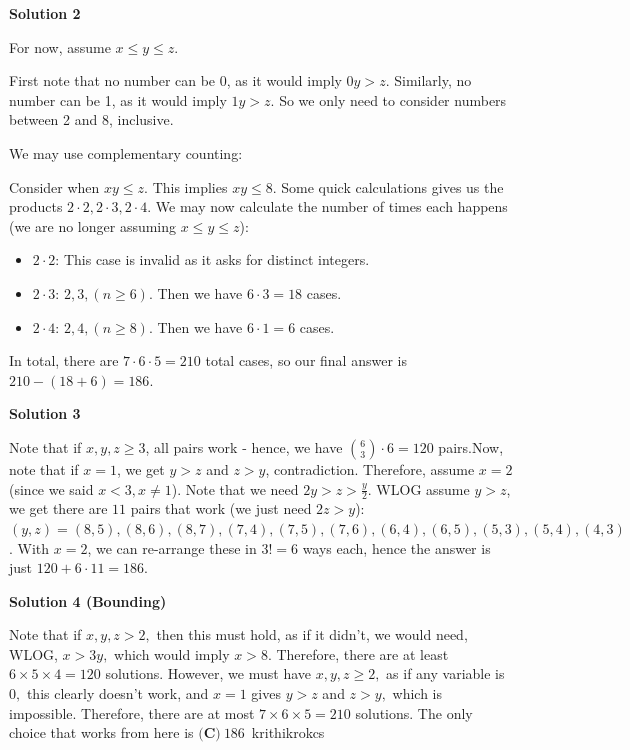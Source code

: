 \begin{enumerate}
 



\textbf{Solution 2}

For now, assume $x\leq y\leq z$.

 First note that no number can be 0, as it would imply $0y>z$. Similarly, no number can be 1, as it would imply $1y>z$. So we only need to consider numbers between 2 and 8, inclusive.

 We may use complementary counting:

 Consider when $xy\leq z$. This implies $xy\leq 8$. Some quick calculations gives us the products $2\cdot2,2\cdot3,2\cdot4$. We may now calculate the number of times each happens (we are no longer assuming $x\leq y\leq z$):

 
            \begin{itemize}
        \item $2\cdot2$: This case is invalid as it asks for distinct integers.
        \item $2\cdot3$: $2,3,(n\geq6)$. Then we have $6\cdot3=18$ cases.
        \item $2\cdot4$: $2,4,(n\geq8)$. Then we have $6\cdot1=6$ cases.
            \end{itemize}
            In total, there are $7\cdot6\cdot5=210$ total cases, so our final answer is $210 - (18 + 6) = \boxed{186}$.

 



\textbf{Solution 3}

Note that if $x,y,z \ge 3$, all pairs work - hence, we have $\binom{6}{3} \cdot 6 = 120$ pairs.Now, note that if $x=1$, we get $y>z$ and $z>y$, contradiction. Therefore, assume $x=2$ (since we said $x < 3, x \neq 1$). Note that we need $2y>z>\frac{y}{2}$. WLOG assume $y>z$, we get there are $11$ pairs that work (we just need $2z>y$): $(y,z) = (8,5), (8,6), (8,7), (7,4), (7,5), (7,6), (6,4), (6,5), (5,3), (5,4), (4,3)$. With $x=2$, we can re-arrange these in $3!=6$ ways each, hence the answer is just $120 + 6 \cdot 11 = \boxed{186}$.

 



\textbf{Solution 4 (Bounding)}

Note that if $x,y,z>2,$ then this must hold, as if it didn't, we would need, WLOG, $x>3y,$ which would imply $x>8.$ Therefore, there are at least $6\times 5\times 4=120$ solutions. However, we must have $x,y,z\ge2,$ as if any variable is $0,$ this clearly doesn't work, and $x=1$ gives $y>z$ and $z>y,$ which is impossible. Therefore, there are at most $7\times6\times5=210$ solutions. The only choice that works from here is $\boxed{\textbf{(C)}~186}$~krithikrokcs


\end{enumerate}
